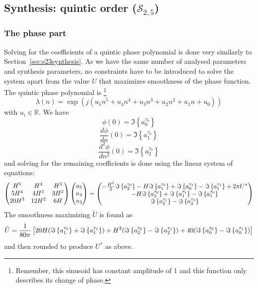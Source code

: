 \subsection{Synthesis: quintic order ($\mathscr{S}_{2,5}$) \label{s25synthesis}}

\subsubsection{The phase part}

Solving for the coefficients of a quintic phase polynomial is done very
similarly to Section~\ref{sec:s23synthesis}. As we have the same number of
analysed parameters and synthesis parameters, no constraints have to be
introduced to solve the system apart from the value $U$ that maximizes
smoothness of the phase function. The quintic phase polynomial is%
\footnote{Remember, this sinusoid has constant amplitude of 1 and
this function only describes its change of phase.}
\begin{equation}
    \label{eq:quinticphasepoly}
    \lambda(n) = \exp \left(j\left(u_5 n^{5} + u_4 n^{4} + u_3 n^{3} + u_2 n^{2}
    + u_1 n + u_0 \right)\right)
\end{equation}
with $u_i \in \mathbb{R}$. We have
\[
    \phi(0) = \Im \left\{ a^{\tau_0}_0 \right\}
\]
\[
    \frac{d \phi}{d n}(0) = \Im \left\{ a^{\tau_0}_1 \right\}
\]
\[
    \frac{d^{2} \phi}{d n^{2}}(0) = \Im \left\{ a^{\tau_0}_2 \right\}
\]
and solving for the remaining coefficients is done using the linear system of
equations:
\begin{equation}
    \begin{pmatrix}
        H^5 & H^4 & H^3 \\
        5 H^4 & 4 H^3 & 3 H^2 \\
        20 H^3 & 12 H^2 & 6 H
    \end{pmatrix}
    \begin{pmatrix}
        u_5 \\
        u_4 \\
        u_3
    \end{pmatrix}
    =
    \begin{pmatrix}
        -\frac{ H^{2} }{2} \Im \left\{  a^{\tau_0}_2  \right\} - H \Im \left\{  a^{\tau_0}_1  \right\} +
            \Im \left\{  a^{\tau_1}_0  \right\} - \Im \left\{  a^{\tau_1}_1  \right\} + 2 \pi U^{\ast}\\
        -H \Im \left\{  a^{\tau_0}_2  \right\} + \Im \left\{  a^{\tau_1}_1  \right\} - \Im \left\{  a^{\tau_0}_1  \right\} \\
        \Im \left\{  a^{\tau_1}_2  \right\} - \Im \left\{  a^{\tau_0}_2  \right\}
    \end{pmatrix}
\end{equation}
The smoothness maximizing $\tilde{U}$ is found as
\[
    \tilde{U} = \frac{1}{80 \pi} \left[ 20 H ( \Im \left\{  a^{\tau_0}_1  \right\} + \Im \left\{  a^{\tau_1}_1  \right\} )
        + H^2 ( \Im \left\{  a^{\tau_0}_2  \right\} - \Im \left\{  a^{\tau_1}_2  \right\} )
        + 40 ( \Im \left\{  a^{\tau_0}_0  \right\} - \Im \left\{  a^{\tau_1}_0  \right\} ) \right]
\]
and then rounded to produce $U^{\ast}$ as above.

